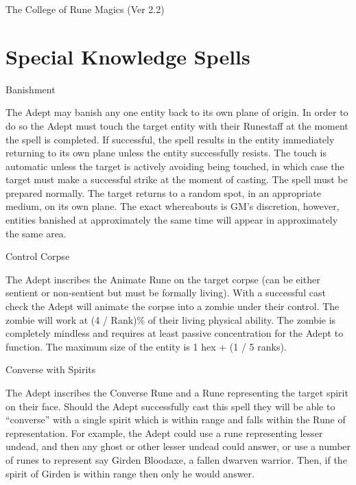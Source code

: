\begin{Chapter}{The College of Rune Magics (Ver 2.2)}
\section{Special Knowledge Spells}

\begin{spell}[S-1]{Banishment}

\begin{effects}
The Adept may banish any one entity back to its own plane of origin.
In order to do so the Adept must touch the target entity with their
Runestaff at the moment the spell is completed.  If successful, the
spell results in the entity immediately returning to its own plane
unless the entity successfully resists.  The touch is automatic unless
the target is actively avoiding being touched, in which case the
target must make a successful strike at the moment of casting.  The
spell must be prepared normally.  The target returns to a random spot,
in an appropriate medium, on its own plane.  The exact whereabouts is
GM’s discretion, however, entities banished at approximately the same
time will appear in approximately the same area.
\end{effects}
\end{spell}

\begin{spell}[S-2]{Control Corpse}

\begin{effects}
The Adept inscribes the Animate Rune on the target corpse (can be
either sentient or non-sentient but must be formally living).  With a
successful cast check the Adept will animate the corpse into a zombie
under their control. The zombie will work at (4 / Rank)\% of their
living physical ability. The zombie is completely mindless and
requires at least passive concentration for the Adept to function. The
maximum size of the entity is 1 hex + (1 / 5 ranks).
\end{effects}
\end{spell}

\begin{spell}[S-3]{Converse with Spirits}

\begin{effects}
The Adept inscribes the Converse Rune and a Rune representing the
target spirit on their face.  Should the Adept successfully cast this
spell they will be able to “converse” with a single spirit which is
within range and falls within the Rune of representation. For example,
the Adept could use a rune representing lesser undead, and then any
ghost or other lesser undead could answer, or use a number of runes
to represent say Girden Bloodaxe, a fallen dwarven warrior.  Then, if
the spirit of Girden is within range then only he would answer.


\end{effects}
\end{spell}
\end{Chapter}
